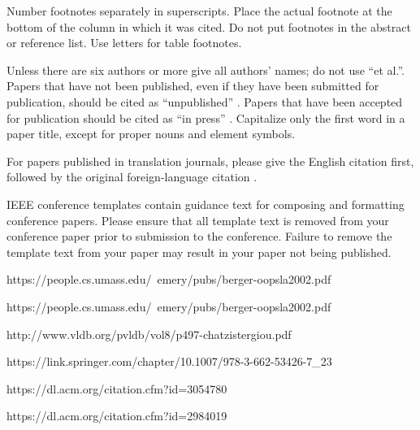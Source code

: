 \documentclass[conference]{IEEEtran}
\begin{document}
Number footnotes separately in superscripts. Place the actual footnote at 
the bottom of the column in which it was cited. Do not put footnotes in the 
abstract or reference list. Use letters for table footnotes.

Unless there are six authors or more give all authors' names; do not use 
``et al.''. Papers that have not been published, even if they have been 
submitted for publication, should be cited as ``unpublished'' \cite{b4}. Papers 
that have been accepted for publication should be cited as ``in press'' \cite{b5}. 
Capitalize only the first word in a paper title, except for proper nouns and 
element symbols.

For papers published in translation journals, please give the English 
citation first, followed by the original foreign-language citation \cite{b6}.




\vspace{12pt}

IEEE conference templates contain guidance text for composing and formatting conference papers. Please ensure that all template text is removed from your conference paper prior to submission to the conference. Failure to remove the template text from your paper may result in your paper not being published.

https://people.cs.umass.edu/~emery/pubs/berger-oopsla2002.pdf

https://people.cs.umass.edu/~emery/pubs/berger-oopsla2002.pdf

http://www.vldb.org/pvldb/vol8/p497-chatzistergiou.pdf

https://link.springer.com/chapter/10.1007/978-3-662-53426-7_23

https://dl.acm.org/citation.cfm?id=3054780

https://dl.acm.org/citation.cfm?id=2984019
\end{document}

